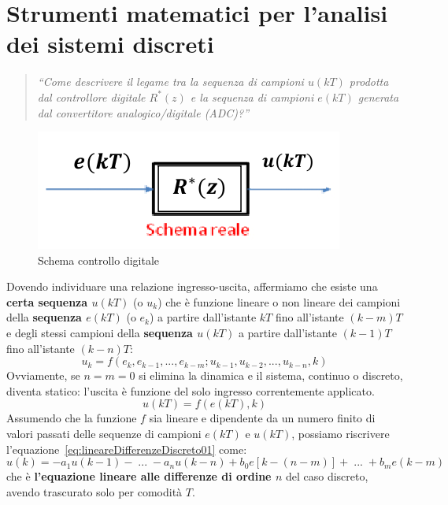 \documentclass[a4paper]{report}
\newcommand{\bo}{\bfseries }
\begin{document}
\section{Strumenti matematici per l'analisi dei sistemi discreti}
\begin{quote}
  {\em ``Come descrivere il legame tra la sequenza di campioni $u(kT)$
    prodotta dal controllore digitale $R^*(z)$ e la sequenza di campioni
    $e(kT)$ generata dal convertitore analogico/digitale (ADC)?''
  }
\end{quote}
\begin{figure}[!hbp]
  \begin{center}
    \includegraphics[scale=0.5]{./figures/controlloDigitaleSchemaReale}
    \caption{Schema controllo
      digitale}\label{fig:controlloDigitaleSchemaReale} 
  \end{center}
\end{figure}
Dovendo individuare una relazione ingresso-uscita, affermiamo che
esiste una {\bo certa sequenza $u(kT)$} (o $u_k$) che \`e funzione
lineare o non lineare dei campioni della {\bo sequenza $e(kT)$} (o $e_k$)
a partire dall'istante $kT$ fino all'istante $(k - m)T$ e degli stessi
campioni della {\bo sequenza $u(kT)$} a partire dall'istante $(k
- 1)T$ fino all'istante $(k - n)T$:
\begin{equation}\label{eq:lineareDifferenzeDiscreto01}
  u_k = f(e_k, e_{k-1}, ... , e_{k-m};u_{k-1}, u_{k-2}, ..., u_{k-n}, k)
\end{equation}
Ovviamente, se $n = m = 0$ si elimina la dinamica e il sistema,
continuo o discreto, diventa statico: l'uscita \`e funzione del solo
ingresso correntemente applicato.
\[
u(kT) = f(e(kT), k)
\]
Assumendo che la funzione $f$ sia lineare e dipendente da un
numero finito di valori passati delle sequenze di campioni $e(kT)$ e
$u(kT)$, possiamo riscrivere
l'equazione~\ref{eq:lineareDifferenzeDiscreto01} come:
\begin{equation}\label{eq:lineareDifferenzeDiscreto02}
  u(k) = - a_1 u (k - 1) - \;...\; - a_n u (k - n) + b_0 e [k - (n -
    m)] + \;...\; + b_m e (k - m)
\end{equation}
che \`e {\bo l'equazione lineare alle differenze di ordine
  $n$} del caso
discreto, avendo trascurato solo per comodit\`a $T$.
\end{document}
